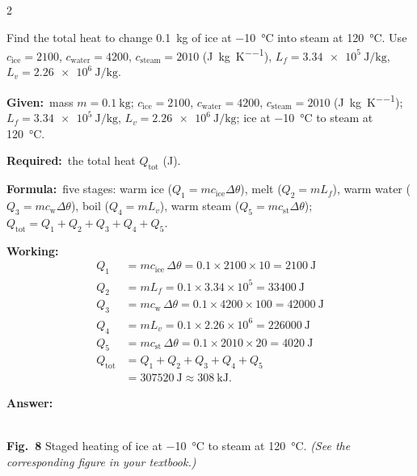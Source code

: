 \documentclass[10pt]{article}
\newcommand{\Given}{\par\vspace{2pt}\textbf{Given:}\ }
\newcommand{\Required}{\par\vspace{2pt}\textbf{Required:}\ }
\newcommand{\Formula}{\par\vspace{2pt}\textbf{Formula:}\ }
\newcommand{\Working}{\par\vspace{2pt}\textbf{Working:}}
\newcommand{\Answer}[1]{\par\vspace{2pt}\textbf{Answer:}\ \fbox{#1}}
\begin{document}
\begin{multicols}{2}
\begin{example}
Find the total heat to change \SI{0.1}{\kilogram} of ice at
\SI{-10}{\degreeCelsius} into steam at \SI{120}{\degreeCelsius}. Use
$c_{\text{ice}}=2100$, $c_{\text{water}}=4200$, $c_{\text{steam}}=2010$
(\si{\joule\per\kilogram\per\kelvin}),
$L_f=\SI{3.34e5}{\joule\per\kilogram}$,
$L_v=\SI{2.26e6}{\joule\per\kilogram}$.
\tcblower
\Given mass $m = \SI{0.1}{\kilogram}$;
$c_{\text{ice}}=2100$, $c_{\text{water}}=4200$, $c_{\text{steam}}=2010$
(\si{\joule\per\kilogram\per\kelvin});
$L_f=\SI{3.34e5}{\joule\per\kilogram}$,
$L_v=\SI{2.26e6}{\joule\per\kilogram}$; ice at
\SI{-10}{\degreeCelsius} to steam at \SI{120}{\degreeCelsius}.
\Required the total heat $Q_{\text{tot}}$ (\si{\joule}).
\Formula five stages: warm ice ($Q_1=mc_{\text{ice}}\Delta\theta$),
melt ($Q_2=mL_f$), warm water ($Q_3=mc_{\text{w}}\Delta\theta$),
boil ($Q_4=mL_v$), warm steam ($Q_5=mc_{\text{st}}\Delta\theta$);
$Q_{\text{tot}}=Q_1+Q_2+Q_3+Q_4+Q_5$.
\Working
\begin{align*}
  Q_1 &= m c_{\text{ice}}\,\Delta\theta = 0.1\times2100\times10 = \SI{2100}{\joule}\\
  Q_2 &= m L_f = 0.1\times3.34\times10^{5} = \SI{33400}{\joule}\\
  Q_3 &= m c_{\text{w}}\,\Delta\theta = 0.1\times4200\times100 = \SI{42000}{\joule}\\
  Q_4 &= m L_v = 0.1\times2.26\times10^{6} = \SI{226000}{\joule}\\
  Q_5 &= m c_{\text{st}}\,\Delta\theta = 0.1\times2010\times20 = \SI{4020}{\joule}\\
  Q_{\text{tot}} &= Q_1+Q_2+Q_3+Q_4+Q_5\\
      &= \SI{307520}{\joule} \approx \SI{308}{\kilo\joule}.
\end{align*}
\Answer{$Q_{\text{tot}} \approx \SI{308}{\kilo\joule}$}
\end{example}

\begin{center}
\\[2pt]
{\scriptsize\textbf{Fig.\ 8} Staged heating of ice at
\SI{-10}{\celsius} to steam at \SI{120}{\celsius}.
\textit{(See the corresponding figure in your textbook.)}}
\end{center}


\end{multicols}
\end{document}
